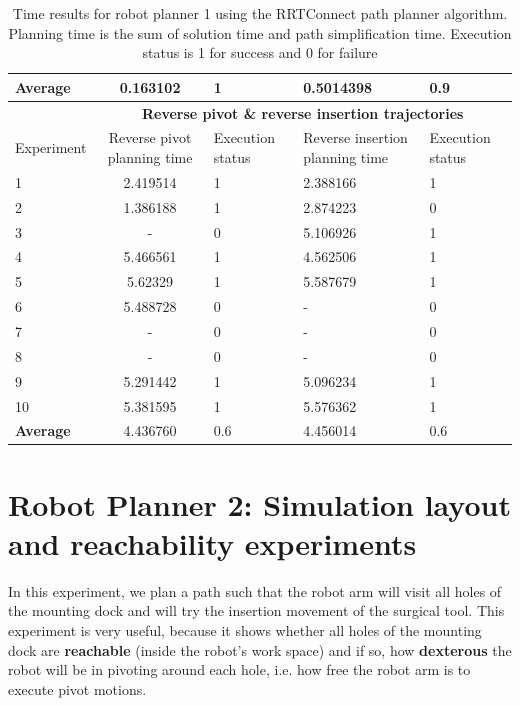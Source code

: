 \begin{table}[H]
\begin{tabular}{|p{2cm}|c|p{2cm}|p{2cm}|p{2cm}|}
\hline
\textbf{Average} & 	0.163102 & 1	& 0.5014398 &	0.9 \\
\hline
                          & \multicolumn{4}{c}{\textbf{Reverse pivot \& reverse insertion trajectories}}                     \vline \\
\hline
Experiment                & Reverse pivot planning time & Execution status & Reverse insertion planning time & Execution status  \\
\hline
1 & 2.419514	& 1	& 2.388166	& 1 \\
2 & 1.386188	& 1	& 2.874223	& 0 \\
3 & -	& 0	& 5.106926	& 1 \\
4 & 5.466561	& 1	& 4.562506	& 1 \\
5 & 5.62329	& 1	& 5.587679	& 1 \\
6 & 5.488728	& 0	& -	& 0 \\
7 & -	& 0	& -	& 0 \\
8 & -	& 0	& -	& 0 \\
9 & 5.291442	& 1	& 5.096234	& 1 \\
10 & 5.381595	& 1	& 5.576362	& 1 \\
\hline
\textbf{Average} & 	4.436760	& 0.6	& 4.456014	& 0.6 \\
\hline
\end{tabular}
\caption{Time results for robot planner 1 using the RRTConnect path planner algorithm. Planning time is the sum of solution time and path simplification time. Execution status is 
1 for success and 0 for failure}
\label{robot-planner1-rrtconnect-data}
\end{table}


\section{Robot Planner 2: Simulation layout and reachability experiments}

In this experiment, we plan a path such that the robot arm will visit all holes of the mounting dock and will try the insertion movement of the surgical tool.
This experiment is very useful, because it shows whether all holes of the mounting dock are \textbf{reachable} (inside the robot's work space) and if so, how 
\textbf{dexterous} the robot will be in pivoting around each hole, i.e. how free the robot arm is to execute pivot motions.

